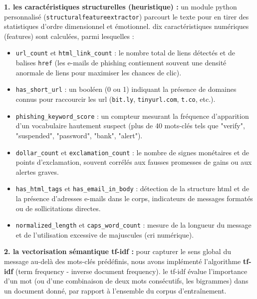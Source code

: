 \documentclass[12pt,a4paper]{report}
\begin{document}
\textbf{1. les caractéristiques structurelles (heuristique) :}
un module python personnalisé (\texttt{structuralfeatureextractor}) parcourt le texte pour en tirer des statistiques d'ordre dimensionnel et émotionnel. dix caractéristiques numériques (features) sont calculées, parmi lesquelles :
\begin{itemize}
    \item \texttt{url\_count} et \texttt{html\_link\_count} : le nombre total de liens détectés et de balises \texttt{href} (les e-mails de phishing contiennent souvent une densité anormale de liens pour maximiser les chances de clic).
    \item \texttt{has_short_url} : un booléen (0 ou 1) indiquant la présence de domaines connus pour raccourcir les url (\texttt{bit.ly}, \texttt{tinyurl.com}, \texttt{t.co}, etc.).
    \item \texttt{phishing_keyword_score} : un compteur mesurant la fréquence d'apparition d'un vocabulaire hautement suspect (plus de 40 mots-clés tels que "verify", "suspended", "password", "bank", "alert").
    \item \texttt{dollar_count} et \texttt{exclamation_count} : le nombre de signes monétaires et de points d'exclamation, souvent corrélés aux fausses promesses de gains ou aux alertes graves.
    \item \texttt{has_html_tags} et \texttt{has_email_in_body} : détection de la structure html et de la présence d'adresses e-mails dans le corps, indicateurs de messages formatés ou de sollicitations directes.
    \item \texttt{normalized_length} et \texttt{caps_word_count} : mesure de la longueur du message et de l'utilisation excessive de majuscules (cri numérique).
\end{itemize}

\textbf{2. la vectorisation sémantique tf-idf :}
pour capturer le sens global du message au-delà des mots-clés prédéfinis, nous avons implémenté l'algorithme \textbf{tf-idf} (term frequency - inverse document frequency). le tf-idf évalue l'importance d'un mot (ou d'une combinaison de deux mots consécutifs, les bigrammes) dans un document donné, par rapport à l'ensemble du corpus d'entraînement.
\end{document}
